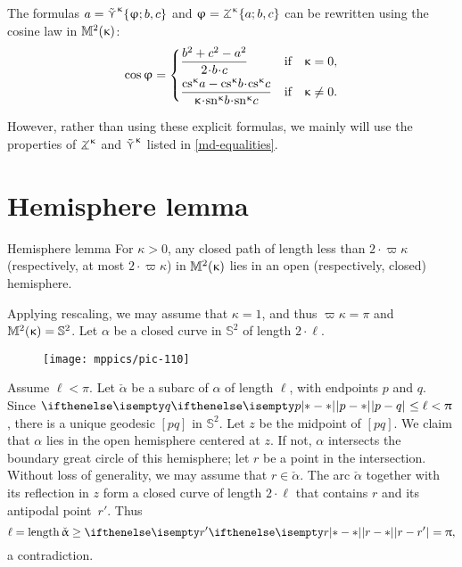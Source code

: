 The formulas $a
=
\mathop{\tilde\curlyvee}\nolimits^{\upkappa}\{\upvarphi;b,c\}$ and
$\phi
=
\tangle\mc\kappa\{a;b,c\}$
can be rewritten using the cosine law in $\mathbb{M}_{{}}^{2}({\upkappa})$:
\[\cos\phi
=\left\{\begin{aligned}
&\frac{b^2+c^2-a^2}{2\cdot b\cdot c}
&\text{if}&\quad \kappa=0,
\\
&\frac{\cs\kappa a-\cs\kappa b\cdot\cs\kappa c}{\kappa\cdot\sn\kappa b\cdot\sn\kappa c}
&\text{if}&\quad \kappa\ne0.
\end{aligned}\right.\]

However, rather than using these explicit formulas, we mainly will use
the properties of $\tangle\mc\kappa$ and $\mathop{\tilde\curlyvee}\nolimits^{\upkappa}$ listed in \ref{md-equalities}.

\section{Hemisphere lemma}\label{curves-in-model}

\begin{thm}{Hemisphere lemma}
\label{lem:hemisphere}
For $\kappa>0$, any closed path of length less than $2\cdot \varpi\kappa$ (respectively, at most $2\cdot \varpi\kappa$) in $\mathbb{M}_{{}}^{2}({\upkappa})$ lies in an open (respectively, closed) hemisphere. 
\end{thm}

Applying rescaling, we may assume that $\kappa=1$, and thus $\varpi\kappa=\pi$ and $\mathbb{M}_{{}}^{2}({\upkappa})=\mathbb{S}^2$.
Let $\alpha$ be a closed curve in $\mathbb{S}^2$ of length $2\cdot\ell$.

\begin{wrapfigure}{o}{35 mm}
\vskip-0mm
\centering
\texttt{[image: mppics/pic-110]}
\end{wrapfigure}

Assume $\ell<\pi$.
Let $\check\alpha$ be a subarc of $\alpha$ of length $\ell$, with endpoints $p$ and $q$. 
Since $\dist{p}{q}{}\le\ell<\pi$, there is a unique geodesic $[pq]$ in $\mathbb{S}^2$. 
Let $z$ be the midpoint of $[pq]$. 
We claim that $\alpha$ lies in the open hemisphere centered at $z$. 
If not, $\alpha$ intersects the boundary great circle of this hemisphere; let $r$ be a point in the intersection.
Without loss of generality, we may assume that $r\in\check\alpha$. 
The arc $\check\alpha$ together with its reflection in $z$ form a closed curve of length $2\cdot \ell$ that contains $r$ and its antipodal point~$r'$.
Thus 
\[\ell=\length \check\alpha\ge \dist{r}{r'}{}=\pi,\] 
a contradiction.

